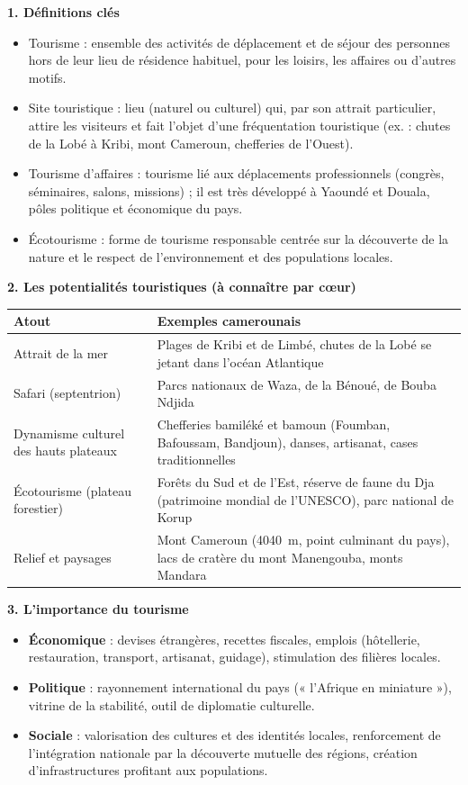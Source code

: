\documentclass[11pt]{article}
\newcommand{\cle}[1]{{\popxbold\color{popdark}#1}}
\begin{document}
\begin{aretenir}
\textbf{1. Définitions clés}
\begin{itemize}
  \item \cle{Tourisme} : ensemble des activités de déplacement et de séjour des personnes hors de leur lieu de résidence habituel, pour les loisirs, les affaires ou d'autres motifs.
  \item \cle{Site touristique} : lieu (naturel ou culturel) qui, par son attrait particulier, attire les visiteurs et fait l'objet d'une fréquentation touristique (ex. : chutes de la Lobé à Kribi, mont Cameroun, chefferies de l'Ouest).
  \item \cle{Tourisme d'affaires} : tourisme lié aux déplacements professionnels (congrès, séminaires, salons, missions) ; il est très développé à Yaoundé et Douala, pôles politique et économique du pays.
  \item \cle{Écotourisme} : forme de tourisme responsable centrée sur la découverte de la nature et le respect de l'environnement et des populations locales.
\end{itemize}

\textbf{2. Les potentialités touristiques (à connaître par cœur)}
\begin{center}
\begin{tabularx}{\linewidth}{|l|X|}
\hline
\rowcolor{popblueL} \textbf{Atout} & \textbf{Exemples camerounais} \\
\hline
Attrait de la mer & Plages de Kribi et de Limbé, chutes de la Lobé se jetant dans l'océan Atlantique \\
\hline
Safari (septentrion) & Parcs nationaux de Waza, de la Bénoué, de Bouba Ndjida \\
\hline
Dynamisme culturel des hauts plateaux & Chefferies bamiléké et bamoun (Foumban, Bafoussam, Bandjoun), danses, artisanat, cases traditionnelles \\
\hline
Écotourisme (plateau forestier) & Forêts du Sud et de l'Est, réserve de faune du Dja (patrimoine mondial de l'UNESCO), parc national de Korup \\
\hline
Relief et paysages & Mont Cameroun (\SI{4040}{m}, point culminant du pays), lacs de cratère du mont Manengouba, monts Mandara \\
\hline
\end{tabularx}
\end{center}

\textbf{3. L'importance du tourisme}
\begin{itemize}
  \item \textbf{Économique} : devises étrangères, recettes fiscales, emplois (hôtellerie, restauration, transport, artisanat, guidage), stimulation des filières locales.
  \item \textbf{Politique} : rayonnement international du pays (« l'Afrique en miniature »), vitrine de la stabilité, outil de diplomatie culturelle.
  \item \textbf{Sociale} : valorisation des cultures et des identités locales, renforcement de l'\cle{intégration nationale} par la découverte mutuelle des régions, création d'infrastructures profitant aux populations.
\end{itemize}


\end{aretenir}
\end{document}
